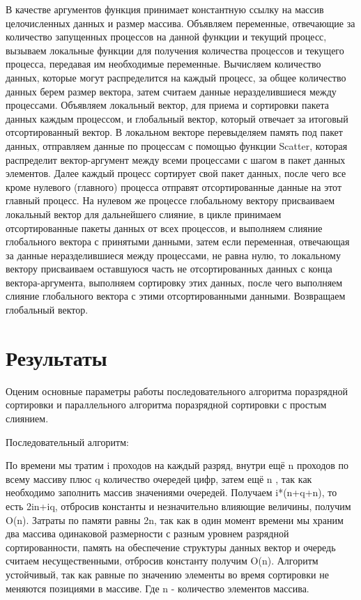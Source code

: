\documentclass{report}
\begin{document}
\par В качестве аргументов функция принимает константную ссылку на массив целочисленных данных и размер массива. Объявляем переменные, отвечающие за количество запущенных процессов на данной функции и текущий процесс, вызываем локальные функции для получения количества процессов и текущего процесса, передавая им необходимые переменные. Вычисляем количество данных, которые могут распределится на каждый процесс, за общее количество данных берем размер вектора, затем считаем данные неразделившиеся между процессами. Объявляем локальный вектор, для приема и сортировки пакета данных каждым процессом, и глобальный вектор, который отвечает за итоговый отсортированный вектор. В локальном векторе перевыделяем память под пакет данных, отправляем данные по процессам с помощью функции Scatter, которая распределит вектор-аргумент между всеми процессами с шагом в пакет данных элементов. Далее каждый процесс сортирует свой пакет данных, после чего все кроме нулевого (главного) процесса отправят отсортированные данные на этот главный процесс. На нулевом же процессе глобальному вектору присваиваем локальный вектор для дальнейшего слияние, в цикле принимаем отсортированные пакеты данных от всех процессов, и выполняем слияние глобального вектора с принятыми данными, затем если переменная, отвечающая за данные неразделившиеся между процессами, не равна нулю, то локальному вектору присваиваем оставшуюся часть не отсортированных данных с конца вектора-аргумента, выполняем сортировку этих данных, после чего выполняем слияние глобального вектора с этими отсортированными данными. Возвращаем глобальный вектор.

\newpage

\section*{Результаты}
Оценим основные параметры работы последовательного алгоритма поразрядной сортировки и параллельного алгоритма поразрядной сортировки с простым слиянием.

Последовательный алгоритм:
\par По времени мы тратим i проходов на каждый разряд, внутри ещё n проходов по всему массиву плюс q количество очередей цифр, затем ещё n , так как необходимо заполнить массив значениями очередей.
Получаем i*(n+q+n), то есть 2in+iq, отбросив константы и незначительно влияющие величины, получим O(n).
Затраты по памяти равны 2n, так как в один момент времени мы храним два массива одинаковой размерности с разным уровнем разрядной сортированности, память на обеспечение структуры данных вектор и очередь считаем несущественными, отбросив константу получим O(n).
Алгоритм устойчивый, так как равные по значению элементы во время сортировки не меняются позициями в массиве. Где n - количество элементов массива.
\end{document}
